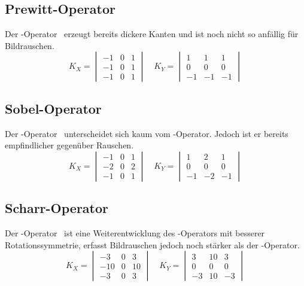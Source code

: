 \subsection*{Prewitt-Operator}
Der -Operator~\cite[S.~108]{prewitt1070} erzeugt bereits dickere Kanten und ist noch nicht so anfällig für Bildrauschen.
\begin{equation}
  K_X = \begin{vmatrix}
    -1 & 0 & 1 \\
    -1 & 0 & 1 \\
    -1 & 0 & 1
  \end{vmatrix}
  \quad
  K_Y = \begin{vmatrix}
     1 &  1 &  1 \\
     0 &  0 &  0 \\
    -1 & -1 & -1
  \end{vmatrix}
\end{equation}

\subsection*{Sobel-Operator}
Der -Operator~\cite[Kapitel~5.2]{davies2012} unterscheidet sich kaum vom -Operator.
Jedoch ist er bereits empfindlicher gegenüber Rauschen.
\begin{equation}
  K_X = \begin{vmatrix}
    -1 & 0 & 1 \\
    -2 & 0 & 2 \\
    -1 & 0 & 1
  \end{vmatrix}
  \quad
  K_Y = \begin{vmatrix}
     1 &  2 &  1 \\
     0 &  0 &  0 \\
    -1 & -2 & -1
  \end{vmatrix}
\end{equation}

\subsection*{Scharr-Operator}
Der -Operator~\cite[Kapitel~9.3]{scharr2000} ist eine Weiterentwicklung des -Operators mit besserer Rotationssymmetrie, erfasst Bildrauschen jedoch noch stärker als der -Operator.
\begin{equation}
  K_X = \begin{vmatrix}
     -3 & 0 &  3 \\
    -10 & 0 & 10 \\
     -3 & 0 &  3
  \end{vmatrix}
  \quad
  K_Y = \begin{vmatrix}
     3 & 10 &  3 \\
     0 &  0 &  0 \\
    -3 & 10 & -3
  \end{vmatrix}
\end{equation}

